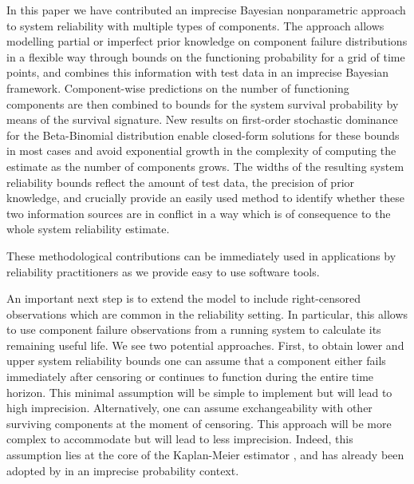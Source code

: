 \documentclass[12pt, a4paper]{elsarticle}
\begin{document}
In this paper we have contributed an imprecise Bayesian nonparametric approach
to system reliability with multiple types of components.
The approach allows modelling partial or imperfect prior knowledge on component failure distributions
in a flexible way through bounds on the functioning probability for a grid of time points, 
and combines this information with test data in an imprecise Bayesian framework.
Component-wise predictions on the number of functioning components
are then combined to bounds for the system survival probability by means of the survival signature.
New results on first-order stochastic dominance for the Beta-Binomial distribution
enable closed-form solutions for these bounds in most cases and 
avoid exponential growth in the complexity of computing the estimate
as the number of components grows.
The widths of the resulting system reliability bounds
reflect the amount of test data, the precision of prior knowledge,
and crucially provide an easily used method to identify 
whether these two information sources are in conflict in a
way which is of consequence to the whole system reliability
estimate.

These methodological contributions can be immediately used in
applications by reliability practitioners as %
we provide easy to use software tools.

An important next step is to extend the model to include right-censored observations which are common in the reliability setting.
In particular, this allows to use component failure observations from a running system
to calculate its remaining useful life.
We see two potential approaches.
First, to obtain lower and upper system reliability bounds 
one can assume that a component either fails immediately after censoring or
continues to function during the entire time horizon.
This minimal assumption will be simple to implement but will lead to high imprecision.
Alternatively, one can assume exchangeability with other surviving components at the moment of censoring.
This approach will be more complex to accommodate but will lead to less imprecision.
Indeed, this assumption lies at the core of the Kaplan-Meier estimator \citep{1958:kaplan-meier},
and has already been adopted by \citet{2004:coolen-yan} in an imprecise probability context.
\end{document}

